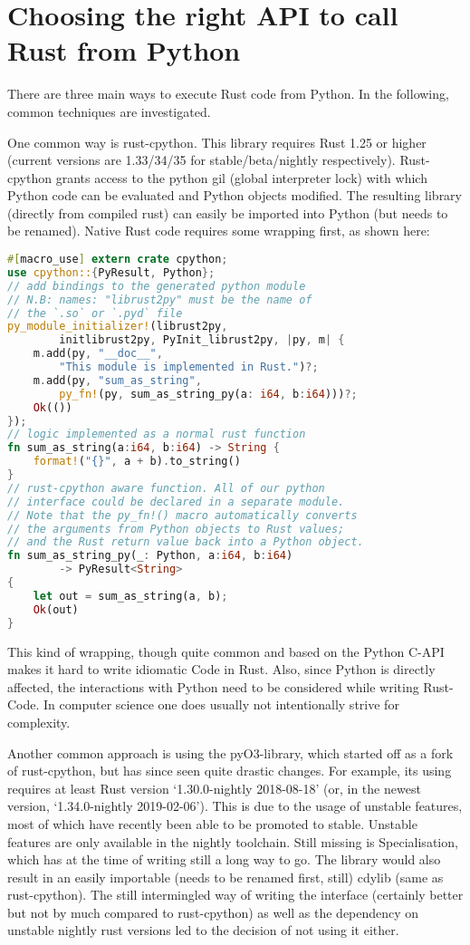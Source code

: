 \section{Choosing the right API to call Rust from Python}\label{sec:api}

There are three main ways to execute Rust code from Python. In the following, common techniques are investigated.

One common way is rust-cpython. This library requires Rust 1.25 or higher
(current versions are 1.33/34/35 for stable/beta/nightly respectively).
Rust-cpython grants access to the python gil (global interpreter lock) with
which Python code can be evaluated and Python objects modified. The resulting
library (directly from compiled rust) can easily be imported into Python (but
needs to be renamed). Native Rust code requires some wrapping first, as shown
here:

\vline
\begin{lstlisting}[language=Rust]
#[macro_use] extern crate cpython;
use cpython::{PyResult, Python};
// add bindings to the generated python module
// N.B: names: "librust2py" must be the name of
// the `.so` or `.pyd` file
py_module_initializer!(librust2py,
        initlibrust2py, PyInit_librust2py, |py, m| {
    m.add(py, "__doc__",
        "This module is implemented in Rust.")?;
    m.add(py, "sum_as_string",
        py_fn!(py, sum_as_string_py(a: i64, b:i64)))?;
    Ok(())
});
// logic implemented as a normal rust function
fn sum_as_string(a:i64, b:i64) -> String {
    format!("{}", a + b).to_string()
}
// rust-cpython aware function. All of our python
// interface could be declared in a separate module.
// Note that the py_fn!() macro automatically converts
// the arguments from Python objects to Rust values;
// and the Rust return value back into a Python object.
fn sum_as_string_py(_: Python, a:i64, b:i64)
        -> PyResult<String>
{
    let out = sum_as_string(a, b);
    Ok(out)
}
\end{lstlisting}
\vline

This kind of wrapping, though quite common and based on the Python C-API makes
it hard to write idiomatic Code in Rust. Also, since Python is directly
affected, the interactions with Python need to be considered while writing
Rust-Code. In computer science one does usually not intentionally strive for
complexity.

Another common approach is using the pyO3-library, which started off as a fork
of rust-cpython, but has since seen quite drastic changes. For example, its
using requires at least Rust version ‘1.30.0-nightly 2018-08-18’ (or, in the
newest version, ‘1.34.0-nightly 2019-02-06’). This is due to the usage of
unstable features, most of which have recently been able to be promoted to
stable. Unstable features are only available in the nightly toolchain.  Still
missing is Specialisation, which has at the time of writing still a long way to
go.  The library would also result in an easily importable (needs to be renamed
first, still) cdylib (same as rust-cpython). The still intermingled way of
writing the interface (certainly better but not by much compared to
rust-cpython) as well as the dependency on unstable nightly rust versions led
to the decision of not using it either.

